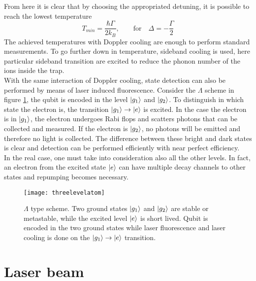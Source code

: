 From here it is clear that by choosing the appropriated detuning, it is possible to reach the lowest temperature
\begin{equation}
T_{min} = \frac{\hbar \Gamma}{2k_{B}}, \qquad \text{for} \quad \Delta = -\frac{\Gamma}{2}
\end{equation}
The achieved temperatures with Doppler cooling are enough to perform standard measurements. To go further down in temperature, sideband cooling is used, here particular sideband transition are excited to reduce the phonon number of the ions inside the trap.\\
With the same interaction of Doppler cooling, state detection can also be performed by means of laser induced fluorescence. Consider the $\Lambda$ scheme in figure \ref{threelevel}, the qubit is encoded in the level $\ket{g_1}$ and $\ket{g_2}$. To distinguish in which state the electron is, the transition $\ket{g_1}\to \ket{e}$ is excited. In the case the electron is in $\ket{g_1}$, the electron undergoes Rabi flops and scatters photons that can be collected and measured. If the electron is $\ket{g_2}$, no photons will be emitted and therefore no light is collected. The difference between these bright and dark states is clear and detection can be performed efficiently with near perfect efficiency.\\
In the real case, one must take into consideration also all the other levels. In fact, an electron from the excited state $\ket{e}$ can have multiple decay channels to other states and repumping becomes necessary.
\begin{figure}
\centering
\texttt{[image: threelevelatom]}
\caption{$\Lambda$ type scheme. Two ground states $\ket{g_1}$ and $\ket{g_2}$ are stable or metastable, while the excited level $\ket{e}$ is short lived. Qubit is encoded in the two ground states while laser fluorescence and laser cooling is done on the $\ket{g_1}\to \ket{e}$ transition.}
\label{threelevel}
\end{figure}
\section{Laser beam}
